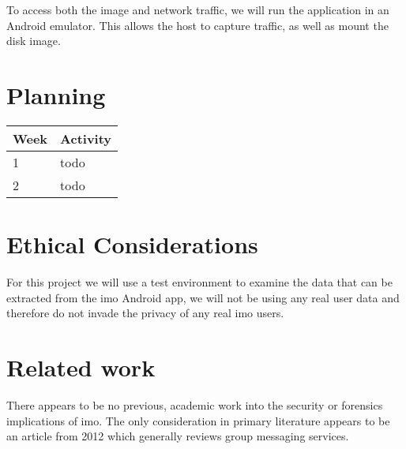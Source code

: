 \documentclass{article}
\begin{document}
To access both the image and network traffic, we will run the application in an
Android emulator. This allows the host to capture traffic, as well as mount the
disk image.


\section{Planning}

\begin{tabular}[H]{ | l | p{10.2cm} | }
	\hline
	\textbf{Week} & \textbf{Activity} \\
	\hline 1 & todo \\
	\hline 2 & todo \\
	\hline
\end{tabular}


\section{Ethical Considerations}

For this project we will use a test environment to examine the data that can be
extracted from the imo Android app, we will not be using any real user data and
therefore do not invade the privacy of any real imo users. 


\section{Related work}

There appears to be no previous, academic work into the security or forensics
implications of imo. The only consideration in primary literature appears to be
an article from 2012 which generally reviews group messaging
services\cite{zhu}.


\printbibliography
\end{document}
